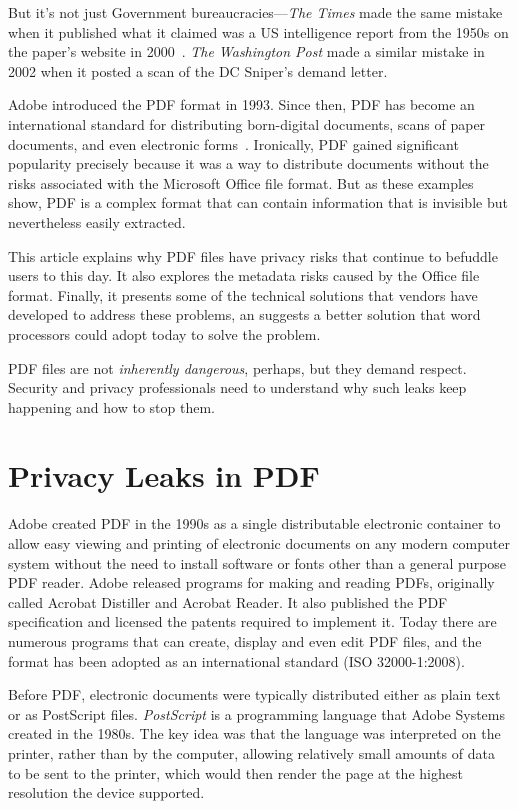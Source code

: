 But it's not just Government bureaucracies---\emph{The Times}  made the
same mistake when it published what it claimed was a US intelligence
report from the 1950s on the paper's
website in 2000~\cite{nyt-unediting-2003}. \emph{The Washington Post}
  made a similar mistake in 2002 when it posted a scan of the DC
  Sniper's demand letter\cite{internet-forensics}.

Adobe introduced the PDF format in 1993. Since then, PDF has become an
international standard for distributing born-digital documents, scans
of paper documents, and even electronic
forms~\cite{ISO32000-1:2008}. Ironically, PDF gained significant
popularity precisely because it was a way to distribute documents
without the risks associated with the Microsoft Office file
format. But as these examples show, PDF is a complex format that can
contain information that is invisible but nevertheless easily
extracted.

This article explains why PDF files have privacy risks that continue
to befuddle users to this day. It also explores the metadata risks
caused by the Office file format. Finally, it presents some of the
technical solutions that vendors have developed to address these
problems, an suggests a better solution that word processors could
adopt today to solve the problem.

PDF files are not \emph{inherently dangerous}, perhaps, but they
demand respect. Security and privacy professionals need to
understand why such leaks keep happening and how to stop them.

\section{Privacy Leaks in PDF}

Adobe created PDF in the 1990s as a single distributable electronic
container to allow easy viewing and printing of electronic documents
on any modern computer system without the need to install software or
fonts other than a general purpose PDF reader. Adobe released programs
for making and reading PDFs, originally called Acrobat Distiller and
Acrobat Reader. It also published the PDF specification and
licensed the patents required to implement it. Today there are
numerous programs that can create, display and even edit PDF files,
and the format has been adopted as an international standard (ISO
32000-1:2008).

Before PDF, electronic documents were typically distributed either as
plain text or as PostScript files. \emph{PostScript} is a programming
language that Adobe Systems created in the 1980s. The key idea was
that the language was interpreted on the printer, rather
than by the computer, allowing relatively small amounts of data to be
sent to the printer, which would then render the page at the highest
resolution the device supported.


